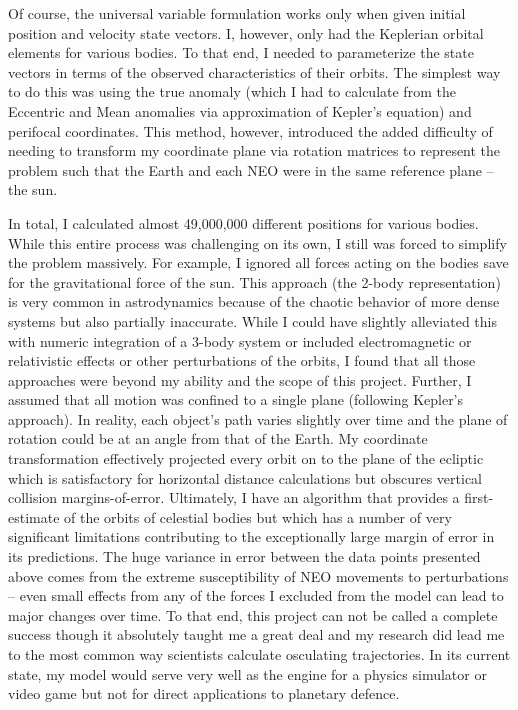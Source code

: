 \documentclass[12pt]{article}
\begin{document}
Of course, the universal variable formulation works only when given initial position and velocity state vectors. I, however, only had the Keplerian orbital elements for various bodies. To that end, I needed to parameterize the state vectors in terms of the observed characteristics of their orbits. The simplest way to do this was using the true anomaly (which I had to calculate from the Eccentric and Mean anomalies via approximation of Kepler's equation) and perifocal coordinates. This method, however, introduced the added difficulty of needing to transform my coordinate plane via rotation matrices to represent the problem such that the Earth and each NEO were in the same reference plane -- the sun. 

In total, I calculated almost 49,000,000 different positions for various bodies. While this entire process was challenging on its own, I still was forced to simplify the problem massively. For example, I ignored all forces acting on the bodies save for the gravitational force of the sun. This approach (the 2-body representation) is very common in astrodynamics because of the chaotic behavior of more dense systems but also partially inaccurate. While I could have slightly alleviated this with numeric integration of a 3-body system or included electromagnetic or relativistic effects or other perturbations of the orbits, I found that all those approaches were beyond my ability and the scope of this project. Further, I assumed that all motion was confined to a single plane (following Kepler's approach). In reality, each object's path varies slightly over time and the plane of rotation could be at an angle from that of the Earth. My coordinate transformation effectively projected every orbit on to the plane of the ecliptic which is satisfactory for horizontal distance calculations but obscures vertical collision margins-of-error. Ultimately, I have an algorithm that provides a first-estimate of the orbits of celestial bodies but which has a number of very significant limitations contributing to the exceptionally large margin of error in its predictions. The huge variance in error between the data points presented above comes from the extreme susceptibility of NEO movements to perturbations -- even small effects from any of the forces I excluded from the model can lead to major changes over time. To that end, this project can not be called a complete success though it absolutely taught me a great deal and my research did lead me to the most common way scientists calculate osculating trajectories. In its current state, my model would serve 
very well as the engine for a physics simulator or video game but not for direct applications to planetary defence. 
\end{document}
